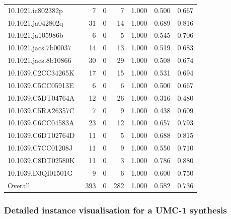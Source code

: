 \begin{table}[t]
{\begin{tabular}{lrrrrrr}
10.1021.ic802382p~\cite{prakash_metalorganic_2009}             &  7 &  0 &  7 & 1.000 & 0.500 & 0.667 \\
10.1021.ja042802q~\cite{sudik_design_2005}                     & 31 &  0 & 14 & 1.000 & 0.689 & 0.816 \\
10.1021.ja105986b~\cite{zheng_cubic_2010}                      &  6 &  0 &  5 & 1.000 & 0.545 & 0.706 \\
10.1021.jacs.7b00037~\cite{zhang_controlled_2017}              & 14 &  0 & 13 & 1.000 & 0.519 & 0.683 \\
10.1021.jacs.8b10866~\cite{zhang_self-assembly_2018}           & 30 &  0 & 29 & 1.000 & 0.508 & 0.674 \\
10.1039.C2CC34265K~\cite{du_giant_2012}                        & 17 &  0 & 15 & 1.000 & 0.531 & 0.694 \\
10.1039.C5CC05913E~\cite{augustyniak_vanadium_2015}            &  6 &  0 &  6 & 1.000 & 0.500 & 0.667 \\
10.1039.C5DT04764A~\cite{zhang_polyoxovanadate-based_2016}     & 12 &  0 & 26 & 1.000 & 0.316 & 0.480 \\
10.1039.C5RA26357C~\cite{chen_synthesis_2016}                  &  7 &  0 &  9 & 1.000 & 0.438 & 0.609 \\
10.1039.C6CC04583A~\cite{zhang_anderson-like_2016}             & 23 &  0 & 12 & 1.000 & 0.657 & 0.793 \\
10.1039.C6DT02764D~\cite{zhang_synthesis_2016}                 & 11 &  0 &  5 & 1.000 & 0.688 & 0.815 \\
10.1039.C7CC01208J~\cite{zhang_self-assembly_2017}             & 11 &  0 &  9 & 1.000 & 0.550 & 0.710 \\
10.1039.C8DT02580K~\cite{gong_functionalized_2018}             & 11 &  0 &  3 & 1.000 & 0.786 & 0.880 \\
10.1039.D3QI01501G~\cite{yang_efficient_2023}                  &  9 &  0 &  6 & 1.000 & 0.600 & 0.750 \\
\hline
Overall                                                          & 393 & 0 & 282 & 1.000 & 0.582 & 0.736 \\
\hline
\end{tabular}
}
\end{table}


\subsubsection{Detailed instance visualisation for a UMC-1 synthesis}\label{subsubsec:umc1_instance_vis}

